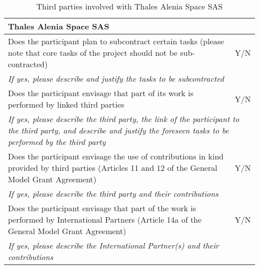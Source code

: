 \begin{table}[H]
	\centering
	\begin{tabular}{|p{10cm}|p{4cm}|}
		\hline
		
		\multicolumn{2}{|p{14cm}|}{\textbf{Thales Alenia Space SAS}}\\
		
		\hline
		
		Does the participant plan to subcontract certain tasks (please note that core tasks of the project should not be sub-contracted) & Y/N\\
		
		\hline
		
		\multicolumn{2}{|p{14cm}|}{\textit{If yes, please describe and justify the tasks to be subcontracted}}\\
		
		\hline
		
		Does the participant envisage that part of its work is performed by linked third parties & Y/N\\
		
		\hline
		
		\multicolumn{2}{|p{14cm}|}{\textit{If yes, please describe the third party, the link of the participant to the third party, and describe and justify the foreseen tasks to be performed by the third party}}\\
		
		\hline
		
		Does the participant envisage the use of contributions in kind provided by third parties (Articles 11 and 12 of the General Model Grant Agreement) & Y/N\\
		
		\hline
		
		\multicolumn{2}{|p{14cm}|}{\textit{If yes, please describe the third party and their contributions}}\\
		
		\hline
		
		Does the participant envisage that part of the work is performed by International Partners (Article 14a of the General Model Grant Agreement) & Y/N\\
		
		\hline
		
		\multicolumn{2}{|p{14cm}|}{\textit{If yes, please describe the International Partner(s) and their contributions}}\\
		
		\hline
	\end{tabular}
	\caption{Third parties involved with Thales Alenia Space SAS}
\end{table}




